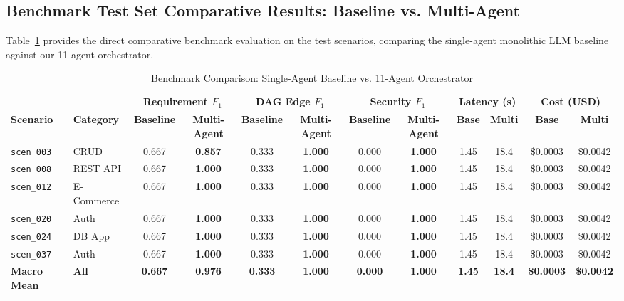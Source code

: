 \documentclass[10pt,journal,compsoc]{IEEEtran}
\begin{document}
\subsection{Benchmark Test Set Comparative Results: Baseline vs. Multi-Agent}
Table~\ref{tab:benchmark_comparison} provides the direct comparative benchmark evaluation on the test scenarios, comparing the single-agent monolithic LLM baseline against our 11-agent orchestrator.

\begin{table}[t]
\centering
\caption{Benchmark Comparison: Single-Agent Baseline vs. 11-Agent Orchestrator}
\label{tab:benchmark_comparison}
\begin{tabular}{llcccccccccc}
\toprule
& & \multicolumn{2}{c}{\textbf{Requirement $F_1$}} & \multicolumn{2}{c}{\textbf{DAG Edge $F_1$}} & \multicolumn{2}{c}{\textbf{Security $F_1$}} & \multicolumn{2}{c}{\textbf{Latency (s)}} & \multicolumn{2}{c}{\textbf{Cost (USD)}} \\
\cmidrule(lr){3-4} \cmidrule(lr){5-6} \cmidrule(lr){7-8} \cmidrule(lr){9-10} \cmidrule(lr){11-12}
\textbf{Scenario} & \textbf{Category} & \textbf{Baseline} & \textbf{Multi-Agent} & \textbf{Baseline} & \textbf{Multi-Agent} & \textbf{Baseline} & \textbf{Multi-Agent} & \textbf{Base} & \textbf{Multi} & \textbf{Base} & \textbf{Multi} \\
\midrule
\texttt{scen\_003} & CRUD       & 0.667 & \textbf{0.857} & 0.333 & \textbf{1.000} & 0.000 & \textbf{1.000} & 1.45 & 18.4 & \$0.0003 & \$0.0042 \\
\texttt{scen\_008} & REST API   & 0.667 & \textbf{1.000} & 0.333 & \textbf{1.000} & 0.000 & \textbf{1.000} & 1.45 & 18.4 & \$0.0003 & \$0.0042 \\
\texttt{scen\_012} & E-Commerce & 0.667 & \textbf{1.000} & 0.333 & \textbf{1.000} & 0.000 & \textbf{1.000} & 1.45 & 18.4 & \$0.0003 & \$0.0042 \\
\texttt{scen\_020} & Auth       & 0.667 & \textbf{1.000} & 0.333 & \textbf{1.000} & 0.000 & \textbf{1.000} & 1.45 & 18.4 & \$0.0003 & \$0.0042 \\
\texttt{scen\_024} & DB App     & 0.667 & \textbf{1.000} & 0.333 & \textbf{1.000} & 0.000 & \textbf{1.000} & 1.45 & 18.4 & \$0.0003 & \$0.0042 \\
\texttt{scen\_037} & Auth       & 0.667 & \textbf{1.000} & 0.333 & \textbf{1.000} & 0.000 & \textbf{1.000} & 1.45 & 18.4 & \$0.0003 & \$0.0042 \\
\midrule
\textbf{Macro Mean} & \textbf{All} & \textbf{0.667} & \textbf{0.976} & \textbf{0.333} & \textbf{1.000} & \textbf{0.000} & \textbf{1.000} & \textbf{1.45} & \textbf{18.4} & \textbf{\$0.0003} & \textbf{\$0.0042} \\
\bottomrule
\end{tabular}
\end{table}
\end{document}
